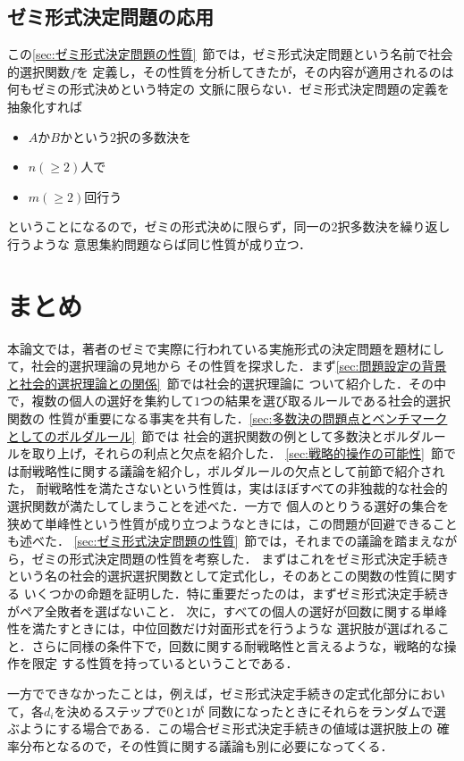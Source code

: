 \documentclass[dvipdfmx]{jsarticle}
\begin{document}
\subsection{ゼミ形式決定問題の応用}\label{subsec:ゼミ形式決定問題の応用}
  この\ref{sec:ゼミ形式決定問題の性質}~節では，ゼミ形式決定問題という名前で社会的選択関数$f$を
  定義し，その性質を分析してきたが，その内容が適用されるのは何もゼミの形式決めという特定の
  文脈に限らない．ゼミ形式決定問題の定義を抽象化すれば
  \begin{itemize}
    \item $A$か$B$かという$2$択の多数決を
    \item $n(\geq 2)$人で
    \item $m(\geq 2)$回行う
  \end{itemize}
  ということになるので，ゼミの形式決めに限らず，同一の2択多数決を繰り返し行うような
  意思集約問題ならば同じ性質が成り立つ．

\section{まとめ}
本論文では，著者のゼミで実際に行われている実施形式の決定問題を題材にして，社会的選択理論の見地から
その性質を探求した．まず\ref{sec:問題設定の背景と社会的選択理論との関係}~節では社会的選択理論に
ついて紹介した．その中で，複数の個人の選好を集約して$1$つの結果を選び取るルールである社会的選択関数の
性質が重要になる事実を共有した．\ref{sec:多数決の問題点とベンチマークとしてのボルダルール}~節では
社会的選択関数の例として多数決とボルダルールを取り上げ，それらの利点と欠点を紹介した．
\ref{sec:戦略的操作の可能性}~節では耐戦略性に関する議論を紹介し，ボルダルールの欠点として前節で紹介された，
耐戦略性を満たさないという性質は，実はほぼすべての非独裁的な社会的選択関数が満たしてしまうことを述べた．一方で
個人のとりうる選好の集合を狭めて単峰性という性質が成り立つようなときには，この問題が回避できることも述べた．
\ref{sec:ゼミ形式決定問題の性質}~節では，それまでの議論を踏まえながら，ゼミの形式決定問題の性質を考察した．
まずはこれをゼミ形式決定手続きという名の社会的選択選択関数として定式化し，そのあとこの関数の性質に関する
いくつかの命題を証明した．特に重要だったのは，まずゼミ形式決定手続きがペア全敗者を選ばないこと．
次に，すべての個人の選好が回数に関する単峰性を満たすときには，中位回数だけ対面形式を行うような
選択肢が選ばれること．さらに同様の条件下で，回数に関する耐戦略性と言えるような，戦略的な操作を限定
する性質を持っているということである．

一方でできなかったことは，例えば，ゼミ形式決定手続きの定式化部分において，各$d_i$を決めるステップで$0$と$1$が
同数になったときにそれらをランダムで選ぶようにする場合である．この場合ゼミ形式決定手続きの値域は選択肢上の
確率分布となるので，その性質に関する議論も別に必要になってくる．
\end{document}
